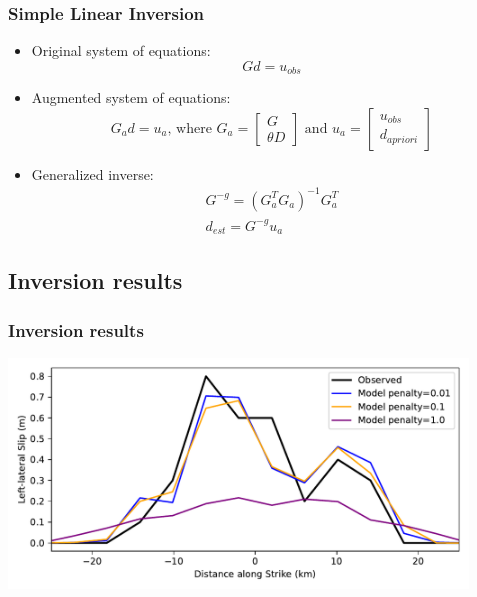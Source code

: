 \documentclass{beamer}
\begin{document}
\begin{frame}
  \frametitle{Simple Linear Inversion}

  \begin{itemize}
  \item Original system of equations:
    \begin{equation}
      G d = u_{obs}
    \end{equation}

  \item Augmented system of equations:
    \begin{equation}
      G_a d = u_a \text{, where } 
      G_a = \left[ \begin{array}{c} G \\ \theta D \end{array} \right]
      \text{ and }
      u_a = \left[ \begin{array}{c} u_{obs} \\ d_{apriori} \end{array} \right]
    \end{equation}
    
  \item Generalized inverse:
    \begin{gather}
      G^{-g} = \left( G_a^T G_a \right)^{-1} G_a^T \\
      d_{est} = G^{-g} u_a
    \end{gather}
  \end{itemize}
  
\end{frame}


\subsection{Inversion results}

\begin{frame}
  \frametitle{Inversion results}

  \vfill
  \begin{center}
    \includegraphics[height=6.1cm]{figs/step06-solution}
  \end{center}
  \vfill
  
\end{frame}

\end{document}
